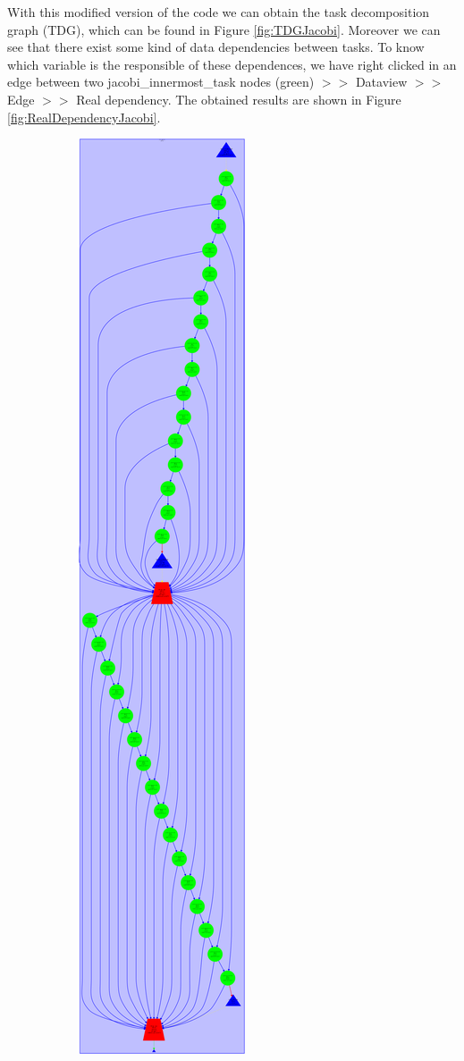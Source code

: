 \documentclass[12pt, a4paper]{article}
\begin{document}
With this modified version of the code we can obtain the task decomposition graph (TDG), which can be found in Figure \ref{fig:TDGJacobi}. Moreover we can see that there exist some kind of data dependencies between tasks. To know which variable is the responsible of these dependences, we have right clicked in an edge between two jacobi\_innermost\_task nodes (green) $>>$ Dataview $>>$ Edge $>>$ Real dependency. The obtained results are shown in Figure \ref{fig:RealDependencyJacobi}.

\begin{figure}[H]
\centering
\begin{subfigure}{0.45\textwidth}
\centering
\includegraphics[scale=0.15]{./images/tareador-jacobi-2a}

\end{subfigure}
\end{figure}
\end{document}
